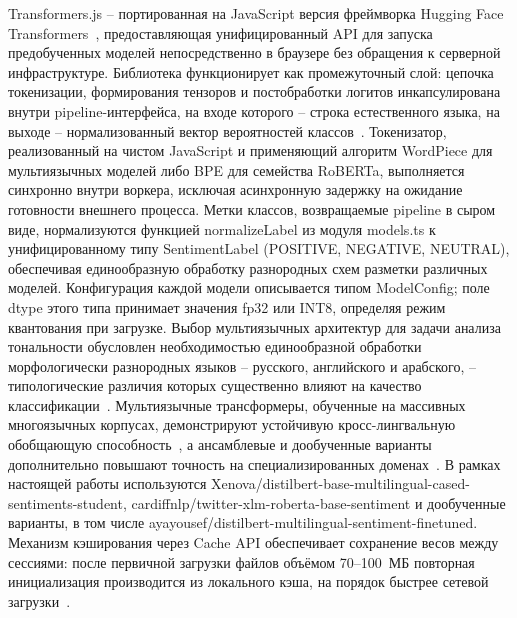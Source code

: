 Transformers.js – портированная на JavaScript версия фреймворка Hugging Face Transformers~\cite{wolf2020transformers}, предоставляющая унифицированный API для запуска предобученных моделей непосредственно в браузере без обращения к серверной инфраструктуре. Библиотека функционирует как промежуточный слой: цепочка токенизации, формирования тензоров и постобработки логитов инкапсулирована внутри pipeline-интерфейса, на входе которого – строка естественного языка, на выходе – нормализованный вектор вероятностей классов~\cite{xu2024ondevice}. Токенизатор, реализованный на чистом JavaScript и применяющий алгоритм WordPiece для мультиязычных моделей либо BPE для семейства RoBERTa, выполняется синхронно внутри воркера, исключая асинхронную задержку на ожидание готовности внешнего процесса. Метки классов, возвращаемые pipeline в сыром виде, нормализуются функцией normalizeLabel из модуля models.ts к унифицированному типу SentimentLabel (POSITIVE, NEGATIVE, NEUTRAL), обеспечивая единообразную обработку разнородных схем разметки различных моделей. Конфигурация каждой модели описывается типом ModelConfig; поле dtype этого типа принимает значения fp32 или INT8, определяя режим квантования при загрузке. Выбор мультиязычных архитектур для задачи анализа тональности обусловлен необходимостью единообразной обработки морфологически разнородных языков – русского, английского и арабского, – типологические различия которых существенно влияют на качество классификации~\cite{krasitskii2025sentiment}. Мультиязычные трансформеры, обученные на массивных многоязычных корпусах, демонстрируют устойчивую кросс-лингвальную обобщающую способность~\cite{li2024multilingual}, а ансамблевые и дообученные варианты дополнительно повышают точность на специализированных доменах~\cite{hasan2024ensemble}. В рамках настоящей работы используются Xenova/distilbert-base-multilingual-cased-sentiments-student, cardiffnlp/twitter-xlm-roberta-base-sentiment и дообученные варианты, в том числе ayayousef/distilbert-multilingual-sentiment-finetuned. Механизм кэширования через Cache API обеспечивает сохранение весов между сессиями: после первичной загрузки файлов объёмом 70–100~МБ повторная инициализация производится из локального кэша, на порядок быстрее сетевой загрузки~\cite{wang2024anatomizing}.


